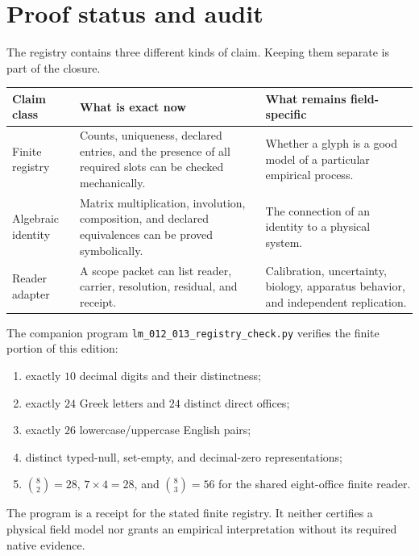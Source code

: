 \documentclass[11pt]{article}
\begin{document}
\section{Proof status and audit}
The registry contains three different kinds of claim. Keeping them separate is part of the closure.

\begin{center}
\begin{tabularx}{\textwidth}{@{}p{}Y Y@{}}
\toprule
\textbf{Claim class} & \textbf{What is exact now} & \textbf{What remains field-specific}\\
\midrule
Finite registry & Counts, uniqueness, declared entries, and the presence of all required slots can be checked mechanically. & Whether a glyph is a good model of a particular empirical process.\\
Algebraic identity & Matrix multiplication, involution, composition, and declared equivalences can be proved symbolically. & The connection of an identity to a physical system.\\
Reader adapter & A scope packet can list reader, carrier, resolution, residual, and receipt. & Calibration, uncertainty, biology, apparatus behavior, and independent replication.\\
\bottomrule
\end{tabularx}
\end{center}

The companion program \texttt{lm\_012\_013\_registry\_check.py} verifies the finite portion of this edition:
\begin{enumerate}[leftmargin=1.8em,itemsep=.35em]
\item exactly $10$ decimal digits and their distinctness;
\item exactly $24$ Greek letters and $24$ distinct direct offices;
\item exactly $26$ lowercase/uppercase English pairs;
\item distinct typed-null, set-empty, and decimal-zero representations;
\item $\binom{8}{2}=28$, $7\times4=28$, and $\binom{8}{3}=56$ for the shared eight-office finite reader.
\end{enumerate}
The program is a receipt for the stated finite registry. It neither certifies a physical field model nor grants an empirical interpretation without its required native evidence.
\end{document}
